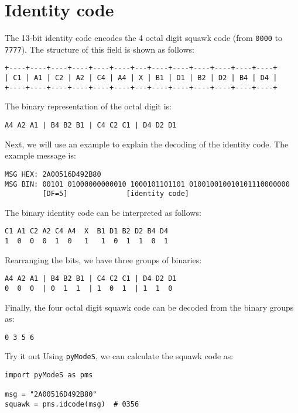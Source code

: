 \section{Identity code} \label{sec:id_code}

The 13-bit identity code encodes the 4 octal digit squawk code (from \texttt{0000} to \texttt{7777}). The structure of this field is shown as follows:

\begin{verbatim}
+----+----+----+----+----+----+---+----+----+----+----+----+----+
| C1 | A1 | C2 | A2 | C4 | A4 | X | B1 | D1 | B2 | D2 | B4 | D4 |
+----+----+----+----+----+----+---+----+----+----+----+----+----+
\end{verbatim}

The binary representation of the octal digit is:

\begin{verbatim}
A4 A2 A1 | B4 B2 B1 | C4 C2 C1 | D4 D2 D1
\end{verbatim}


Next, we will use an example to explain the decoding of the identity code. The example message is:

\begin{verbatim}
MSG HEX: 2A00516D492B80
MSG BIN: 00101 01000000000010 1000101101101 010010010010101110000000
         [DF=5]              [identity code]
\end{verbatim}

The binary identity code can be interpreted as follows:

\begin{verbatim}
C1 A1 C2 A2 C4 A4  X  B1 D1 B2 D2 B4 D4
1  0  0  0  1  0   1   1  0  1  1  0  1
\end{verbatim}

Rearranging the bits, we have three groups of binaries:
\begin{verbatim}
A4 A2 A1 | B4 B2 B1 | C4 C2 C1 | D4 D2 D1
0  0  0  | 0  1  1  | 1  0  1  | 1  1  0
\end{verbatim}

Finally, the four octal digit squawk code can be decoded from the binary groups as:
\begin{verbatim}
0 3 5 6
\end{verbatim}

\begin{notebox}{Try it out}
Using \texttt{pyModeS}, we can calculate the squawk code as: 

\begin{verbatim}
import pyModeS as pms

msg = "2A00516D492B80"
squawk = pms.idcode(msg)  # 0356
\end{verbatim}

\end{notebox}
